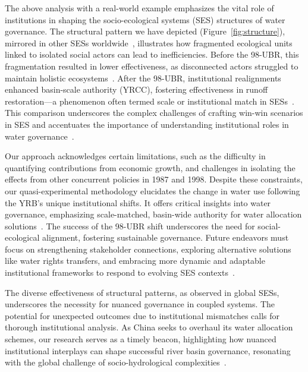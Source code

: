\documentclass[preprint, 12pt]{elsarticle}
\begin{document}
The above analysis with a real-world example emphasizes the vital role of institutions in shaping the socio-ecological systems (SES) structures of water governance.
The structural pattern we have depicted (Figure~\ref{fig:structure}), mirrored in other SESs worldwide~\cite{kluger2020,guerrero2015,bodin2012}, illustrates how fragmented ecological units linked to isolated social actors can lead to inefficiencies.
Before the 98-UBR, this fragmentation resulted in lower effectiveness, as disconnected actors struggled to maintain holistic ecosystems~\cite{sayles2017,sayles2019,cai2016,bergsten2019}.
After the 98-UBR, institutional realignments enhanced basin-scale authority (YRCC), fostering effectiveness in runoff restoration—a phenomenon often termed scale or institutional match in SESs~\cite{cumming2020a,wang2019d}.
This comparison underscores the complex challenges of crafting win-win scenarios in SES and accentuates the importance of understanding institutional roles in water governance~\cite{hegwood2022,bergsten2019, sayles2019}.

Our approach acknowledges certain limitations, such as the difficulty in quantifying contributions from economic growth, and challenges in isolating the effects from other concurrent policies in 1987 and 1998.
Despite these constraints, our quasi-experimental methodology elucidates the change in water use following the YRB's unique institutional shifts.
It offers critical insights into water governance, emphasizing scale-matched, basin-wide authority for water allocation solutions~\cite{bodin2017b, ostrom2009, reyers2018}.
The success of the 98-UBR shift underscores the need for social-ecological alignment, fostering sustainable governance.
Future endeavors must focus on strengthening stakeholder connections, exploring alternative solutions like water rights transfers, and embracing more dynamic and adaptable institutional frameworks to respond to evolving SES contexts~\cite{reyers2018}.

The diverse effectiveness of structural patterns, as observed in global SESs, underscores the necessity for nuanced governance in coupled systems. The potential for unexpected outcomes due to institutional mismatches calls for thorough institutional analysis. As China seeks to overhaul its water allocation schemes, our research serves as a timely beacon, highlighting how nuanced institutional interplays can shape successful river basin governance, resonating with the global challenge of socio-hydrological complexities~\cite{muneepeerakul2017, leslie2015, hegwood2022}.
\end{document}
